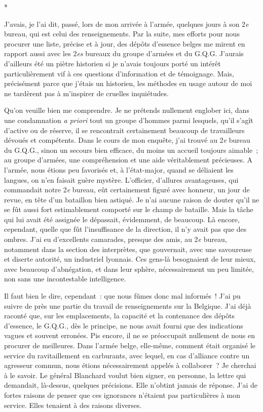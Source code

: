 \documentclass[french,twoside]{book} %
\begin{document}
\begin{center}
*\end{center}
\noindent J’avais, je l’ai dit, passé, lors de mon arrivée à l’armée, quelques jours à son 2\emph{e} bureau, qui est celui des renseignements. Par la suite, mes efforts pour nous procurer une liste, précise et à jour, des dépôts d’essence belges me mirent en rapport aussi avec les 2\emph{es} bureaux du groupe d’armées et du G.Q.G. J’aurais d’ailleurs été un piètre historien si je n’avais toujours porté un intérêt particulièrement vif à ces questions d’information et de témoignage. Mais, précisément parce que j’étais un historien, les méthodes en usage autour de moi ne tardèrent pas à m’inspirer de cruelles inquiétudes.\par
Qu’on veuille bien me comprendre. Je ne prétends nullement englober ici, dans une condamnation \emph{a priori} tout un groupe d’hommes parmi lesquels, qu’il s’agît d’active ou de réserve, il se rencontrait   certainement beaucoup de travailleurs dévoués et compétents. Dans le cours de mon enquête, j’ai trouvé au 2\emph{e} bureau du G.Q.G., sinon un secours bien efficace, du moins un accueil toujours aimable ; au groupe d’armées, une compréhension et une aide véritablement précieuses. A l’armée, nous étions peu favorisés et, à l’état-major, quand se déliaient les langues, on n’en faisait guère mystère. L’officier, d’allures avantageuses, qui commandait notre 2\emph{e} bu­reau, eût certainement figuré avec honneur, un jour de revue, en tête d’un bataillon bien astiqué. Je n’ai aucune raison de douter qu’il ne se fût aussi fort estimablement comporté sur le champ de bataille. Mais la tâche qui lui avait été assignée le dépassait, évidemment, de beaucoup. Là encore, cependant, quelle que fût l’insuffisance de la direction, il n’y avait pas que des ombres. J’ai eu d’excellents cama­rades, presque des amis, au 2\emph{e} bureau, notamment dans la section des interprètes, que gouvernait, avec une savoureuse et diserte autorité, un industriel lyonnais. Ces gens-là besognaient de leur mieux, avec beaucoup d’abnégation, et dans leur sphère, nécessairement un peu limitée, non sans une incontestable intelligence.\par
Il faut bien le dire, cependant : que nous fûmes donc mal informés ! J’ai pu suivre de près une partie du travail de renseignements sur la Belgique. J’ai déjà raconté que, sur les emplacements, la capacité et la contenance des dépôts d’essence, le G.Q.G., dès le principe, ne nous avait fourni que des indications vagues et souvent erronées. Pis encore, il ne se préoccupait nullement de nous en procurer de meilleures. Dans l’armée belge, elle-même, comment était organisé le service du ravitaillement en carburants, avec lequel, en cas d’alliance contre un agresseur commun, nous étions nécessairement appelés à collaborer ? Je cherchai à le savoir. Le général Blanchard voulut bien signer, en personne, la lettre qui demandait, là-dessus, quelques précisions. Elle   n’obtint jamais de réponse. J’ai de fortes raisons de penser que ces ignorances n’étaient pas particulières à mon service. Elles tenaient à des raisons diverses.\par
\end{document}
